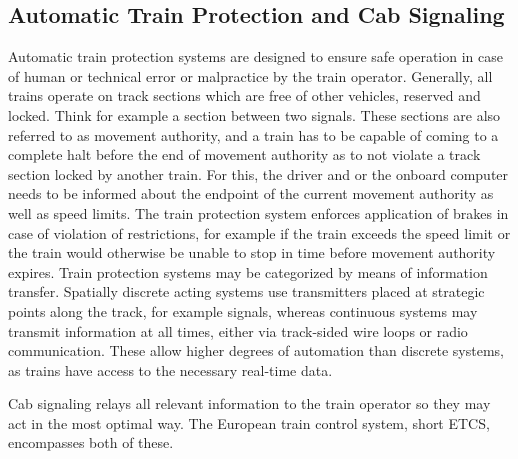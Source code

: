\subsection{Automatic Train Protection and Cab Signaling}
\label{sec:ATPCS}
\par\noindent
Automatic train protection systems are designed to ensure safe operation in case of human or technical error or malpractice by the train operator. Generally, all trains operate on track sections which are free of other vehicles, reserved and locked. Think for example a section between two signals. These sections are also referred to as movement authority, and a train has to be capable of coming to a complete halt before the end of movement authority as to not violate a track section locked by another train. For this, the driver and or the onboard computer needs to be informed about the endpoint of the current movement authority as well as speed limits. The train protection system enforces application of brakes in case of violation of restrictions, for example if the train exceeds the speed limit or the train would otherwise be unable to stop in time before movement authority expires. Train protection systems may be categorized by means of information transfer. Spatially discrete acting systems use transmitters placed at strategic points along the track, for example signals, whereas continuous systems may transmit information at all times, either via track-sided wire loops or radio communication. These allow higher degrees of automation than discrete systems, as trains have access to the necessary real-time data.
\par
Cab signaling relays all relevant information to the train operator so they may act in the most optimal way. The European train control system, short ETCS, encompasses both of these.

